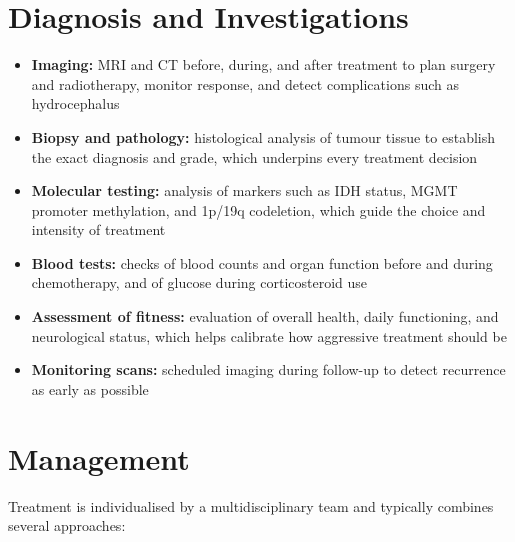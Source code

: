\section*{Diagnosis and Investigations}
\begin{itemize}
    \item \textbf{Imaging:} MRI and CT before, during, and after treatment to plan surgery and radiotherapy, monitor response, and detect complications such as hydrocephalus
    \item \textbf{Biopsy and pathology:} histological analysis of tumour tissue to establish the exact diagnosis and grade, which underpins every treatment decision
    \item \textbf{Molecular testing:} analysis of markers such as IDH status, MGMT promoter methylation, and 1p/19q codeletion, which guide the choice and intensity of treatment
    \item \textbf{Blood tests:} checks of blood counts and organ function before and during chemotherapy, and of glucose during corticosteroid use
    \item \textbf{Assessment of fitness:} evaluation of overall health, daily functioning, and neurological status, which helps calibrate how aggressive treatment should be
    \item \textbf{Monitoring scans:} scheduled imaging during follow-up to detect recurrence as early as possible
\end{itemize}

\section*{Management}
Treatment is individualised by a multidisciplinary team and typically combines several approaches:

